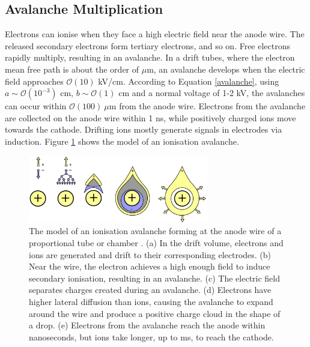\subsection{Avalanche Multiplication}
Electrons can ionise when they face a high electric field near the anode wire. 
The released secondary electrons form tertiary electrons, and so on. Free electrons rapidly multiply, 
resulting in an avalanche. In a drift tubes, where the electron mean free path is about the order of $\mu$m, 
an avalanche develops when the electric field approaches $\mathcal{O}(10)$ kV/cm. 
According to Equation \ref{avalanche}, using $a \sim \mathcal{O}(10^{-3})$ cm, $b \sim \mathcal{O}(1)$ cm and
a normal voltage of 1-2 kV, the avalanches can occur within $\mathcal{O}(100) \ \mu$m from the anode wire. 
Electrons from the avalanche are collected on the anode wire within 1 ns, while positively charged ions move towards the cathode.
Drifting ions mostly generate signals in electrodes via induction. Figure \ref{fig:avalanche} shows the model of an ionisation avalanche.
\begin{figure}[!h]
    \centering
    \includegraphics[width =0.7\textwidth]{figures/png/Screenshot_20240330_182509.png}
    \caption[The model of an ionisation avalanche forming at the anode wire of a proportional tube.]{The model of an ionisation avalanche forming at the anode wire of a proportional tube or chamber \cite{kola}. 
    (a) In the drift volume, electrons and ions are generated and drift to their corresponding electrodes. 
    (b) Near the wire, the electron achieves a high enough field to induce secondary ionisation, resulting in an avalanche. 
    (c) The electric field separates charges created during an avalanche. 
    (d) Electrons have higher lateral diffusion than ions, causing the avalanche to expand 
    around the wire and produce a positive charge cloud in the shape of a drop. 
    (e) Electrons from the avalanche reach the anode within nanoseconds, but ions take longer, up to ms, to reach the cathode.}
    \label{fig:avalanche}
\end{figure}
